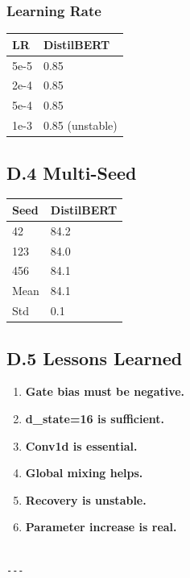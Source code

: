 \subsubsection{Learning Rate}

\begin{table}[H]
\centering
\small
\begin{tabular}{ll}
\toprule
\textbf{LR} & \textbf{DistilBERT} \\
\midrule
5e-5 & 0.85 \\
2e-4 & 0.85 \\
5e-4 & 0.85 \\
1e-3 & 0.85 (unstable) \\
\bottomrule
\end{tabular}
\end{table}

\subsection{D.4 Multi-Seed}

\begin{table}[H]
\centering
\small
\begin{tabular}{ll}
\toprule
\textbf{Seed} & \textbf{DistilBERT} \\
\midrule
42 & 84.2 \\
123 & 84.0 \\
456 & 84.1 \\
Mean & 84.1 \\
Std & 0.1 \\
\bottomrule
\end{tabular}
\end{table}

\subsection{D.5 Lessons Learned}

\begin{enumerate}
\item \textbf{Gate bias must be negative.}
\item \textbf{d\_state=16 is sufficient.}
\item \textbf{Conv1d is essential.}
\item \textbf{Global mixing helps.}
\item \textbf{Recovery is unstable.}
\item \textbf{Parameter increase is real.}
\end{enumerate}
\begin{lstlisting}

---
\end{lstlisting}


